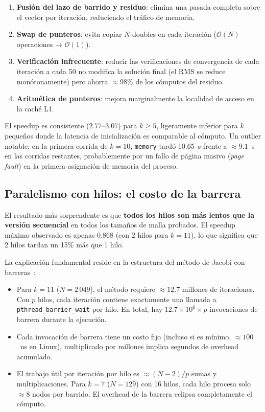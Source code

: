 \documentclass{article}
\begin{document}
\begin{enumerate}
  \item \textbf{Fusión del lazo de barrido y residuo}: elimina una pasada
    completa sobre el vector por iteración, reduciendo el tráfico de memoria.
  \item \textbf{Swap de punteros}: evita copiar $N$ doubles en cada iteración
    ($\mathcal{O}(N)$ operaciones → $\mathcal{O}(1)$).
  \item \textbf{Verificación infrecuente}: reducir las verificaciones de
    convergencia de cada iteración a cada 50 no modifica la solución final
    (el RMS se reduce monótonamente) pero ahorra $\approx 98\%$ de los cómputos
    del residuo.
  \item \textbf{Aritmética de punteros}: mejora marginalmente la localidad de
    acceso en la caché L1.
\end{enumerate}

El speedup es consistente ($2.77$--$3.07$) para $k \geq 5$, ligeramente inferior
para $k$ pequeños donde la latencia de inicialización es comparable al cómputo.
Un outlier notable: en la primera corrida de $k=10$, \texttt{memory} tardó
10.65~s frente a $\approx 9.1$~s en las corridas restantes, probablemente por un
fallo de página masivo (\emph{page fault}) en la primera asignación de memoria
del proceso.

\subsection{Paralelismo con hilos: el costo de la barrera}

El resultado más sorprendente es que \textbf{todos los hilos son más lentos que la
versión secuencial} en todos los tamaños de malla probados.  El speedup máximo
observado es apenas $0.868$ (con 2 hilos para $k=11$), lo que significa que 2
hilos tardan un 15\% más que 1 hilo.

La explicación fundamental reside en la estructura del método de Jacobi con
barreras~\cite{burkardt}:

\begin{itemize}
  \item Para $k=11$ ($N=2\,049$), el método requiere $\approx 12.7$ millones de
    iteraciones.  Con $p$ hilos, cada iteración contiene exactamente una
    llamada a \texttt{pthread\_barrier\_wait} por hilo.  En total, hay
    $12.7 \times 10^6 \times p$ invocaciones de barrera durante la ejecución.
  \item Cada invocación de barrera tiene un costo fijo (incluso si es mínimo,
    $\approx 100$~ns en Linux), multiplicado por millones implica segundos de
    overhead acumulado.
  \item El trabajo útil por iteración por hilo es $\approx (N-2)/p$ sumas y
    multiplicaciones.  Para $k=7$ ($N=129$) con 16 hilos, cada hilo procesa
    solo $\approx 8$ nodos por barrido.  El overhead de la barrera eclipsa
    completamente el cómputo.
\end{itemize}
\end{document}
